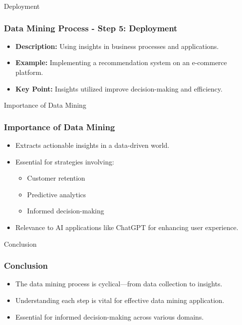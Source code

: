 \documentclass[aspectratio=169]{beamer}
\begin{document}
\begin{frame}[fragile]{Deployment}
    \frametitle{Data Mining Process - Step 5: Deployment}
    \begin{itemize}
        \item \textbf{Description:} Using insights in business processes and applications.
        \item \textbf{Example:} Implementing a recommendation system on an e-commerce platform.
        \item \textbf{Key Point:} Insights utilized improve decision-making and efficiency.
    \end{itemize}
\end{frame}

\begin{frame}[fragile]{Importance of Data Mining}
    \frametitle{Importance of Data Mining}
    \begin{itemize}
        \item Extracts actionable insights in a data-driven world.
        \item Essential for strategies involving:
        \begin{itemize}
            \item Customer retention
            \item Predictive analytics
            \item Informed decision-making
        \end{itemize}
        \item Relevance to AI applications like ChatGPT for enhancing user experience.
    \end{itemize}
\end{frame}

\begin{frame}[fragile]{Conclusion}
    \frametitle{Conclusion}
    \begin{itemize}
        \item The data mining process is cyclical—from data collection to insights.
        \item Understanding each step is vital for effective data mining application.
        \item Essential for informed decision-making across various domains.
    \end{itemize}
\end{frame}
\end{document}
